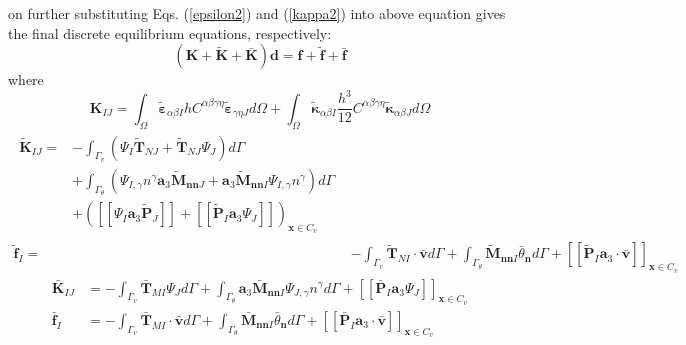 on further substituting Eqs. (\ref{epsilon2}) and (\ref{kappa2}) into above equation gives the final discrete equilibrium equations, respectively: 
\begin{equation}
        (\boldsymbol K + \tilde{\boldsymbol K} + \bar{\boldsymbol K} )\boldsymbol d = \boldsymbol f + \tilde{\boldsymbol f} + \bar{\boldsymbol f}
\end{equation}
where
\begin{equation}\label{de1}
        \boldsymbol K_{IJ} = \int_\Omega \tilde{\boldsymbol \varepsilon}_{\alpha\beta I} hC^{\alpha\beta\gamma\eta}\tilde{\boldsymbol \varepsilon}_{\gamma\eta J} d\Omega + \int_\Omega \tilde{\boldsymbol \kappa}_{\alpha\beta I} \frac{h^3}{12}C^{\alpha\beta\gamma\eta} \tilde{\boldsymbol \kappa}_{\alpha\beta J} d\Omega
\end{equation}
\begin{subequations}\label{de2}
\begin{align}
\begin{split}
        \tilde{\boldsymbol K}_{IJ} = &- \int_{\Gamma_v} (\Psi_I \tilde{\boldsymbol T}_{NJ} + \tilde{\boldsymbol T}_{NJ} \Psi_J) d\Gamma \\
                                     &+ \int_{\Gamma_\theta} (\Psi_{I,\gamma} n^\gamma \boldsymbol a_3 \tilde{\boldsymbol M}_{\boldsymbol{nn}J} + \boldsymbol a_3 \tilde{\boldsymbol M}_{\boldsymbol{nn}I} \Psi_{I,\gamma}n^\gamma)d\Gamma \\
                                     & + ([[\Psi_I \boldsymbol a_3 \tilde{\boldsymbol P}_J]] + [[\tilde{\boldsymbol P}_I \boldsymbol a_3 \Psi_J]])_{\boldsymbol x \in C_v}
\end{split} \\
\tilde{\boldsymbol f}_I = &- \int_{\Gamma_v} \tilde{\boldsymbol T}_{NI} \cdot \bar{\boldsymbol v} d\Gamma + \int_{\Gamma_\theta} \tilde{\boldsymbol M}_{\boldsymbol{nn}I} \bar{\theta}_{\boldsymbol n} d\Gamma + [[\tilde{\boldsymbol P}_I\boldsymbol a_3 \cdot \bar{\boldsymbol v}]]_{\boldsymbol x \in C_v}
\end{align}
\end{subequations}
\begin{subequations}\label{de3}
\begin{align}
\bar{\boldsymbol K}_{IJ} &= - \int_{\Gamma_v} \bar{\boldsymbol T}_{MI} \Psi_J d\Gamma 
+ \int_{\Gamma_\theta} \boldsymbol a_3\bar{\boldsymbol M}_{\boldsymbol{nn}I} \Psi_{J,\gamma}n^\gamma d\Gamma + [[\bar{\boldsymbol P}_I \boldsymbol a_3 \Psi_J]]_{\boldsymbol x \in C_v} \\
\bar{\boldsymbol f}_I &= - \int_{\Gamma_v} \bar{\boldsymbol T}_{MI} \cdot \bar{\boldsymbol v} d\Gamma + \int_{\Gamma_\theta} \bar{\boldsymbol M}_{\boldsymbol{nn} I} \bar{\theta}_{\boldsymbol n} d\Gamma + [[\bar{\boldsymbol P}_I\boldsymbol a_3 \cdot \bar{\boldsymbol v}]]_{\boldsymbol x \in C_v}
\end{align}
\end{subequations}

